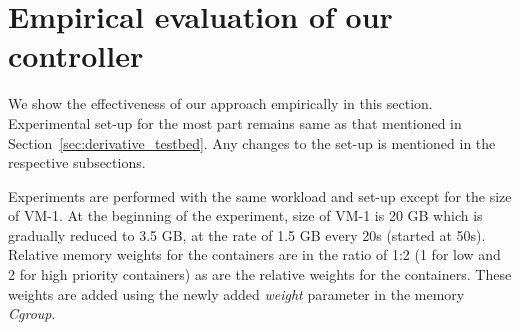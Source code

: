   
  \section{Empirical evaluation of our controller}
       
    We show the effectiveness of our approach empirically in this section. Experimental set-up for the most part remains same as that 
mentioned in Section~\ref{sec:derivative_testbed}. Any changes to the set-up is mentioned in the respective subsections.

    Experiments are performed with the same workload and set-up except for the size of VM-1. At the beginning of the experiment, size of VM-1 
is 20 GB which is gradually reduced to 3.5 GB, at the rate of 1.5 GB every 20s (started at 50s). Relative memory weights for the \mongo{} 
containers are in the ratio of 1:2 (1 for low and 2 for high priority containers) as are the relative weights for the \redis{} 
containers. These weights are added using the newly added \textit{weight} parameter in the memory \textit{Cgroup}. 

	

